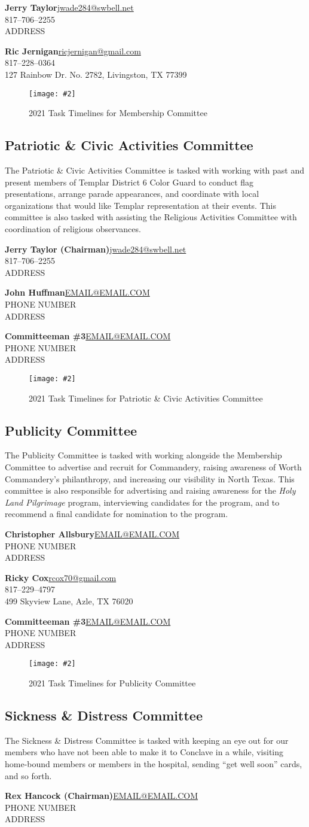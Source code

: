 \documentclass[letterpaper]{article}
\newcommand{\cman}[4]{\textbf{#1}\hfill{}\url{#2}\\\hphantom{0em}\hfill{}#3\\\hphantom{0em}\hfill{}#4}
\newcommand{\comm}[3]{\subsection*{#1 Committee\textsuperscript{#2}}The #1 Committee is tasked with #3\bigskip}
\newcommand{\mand}{\CrossMaltese}
\newcommand{\bylaw}{\Cross}
\newcommand{\gantt}[2]{
	\newgeometry{margin=0.125in}
	\begin{landscape}
		\begin{figure}
			\vspace*{\fill}
			\centering
			\caption{2021 Task Timelines for #1 Committee}
			\texttt{[image: \#2]}%
			\vspace*{\fill}
		\end{figure}
	\end{landscape}
	\restoregeometry
}
\begin{document}
		\cman{Jerry Taylor}{jwade284@swbell.net}{817--706--2255}{ADDRESS}
		
		\cman{Ric Jernigan}{ricjernigan@gmail.com}{817--228--0364}{127 Rainbow Dr. No. 2782, Livingston, TX 77399}
		
		\gantt{Membership}{2021GanttMembership.pdf}
	
	\pagebreak
	
	\comm{Patriotic \& Civic Activities}{\mand}{working with past and present members of Templar District \textnumero{} 6 Color Guard to conduct flag presentations, arrange parade appearances, and coordinate with local organizations that would like Templar representation at their events. This committee is also tasked with assisting the Religious Activities Committee with coordination of religious observances.}
	
		\cman{Jerry Taylor (Chairman)}{jwade284@swbell.net}{817--706--2255}{ADDRESS}
		
		\cman{John Huffman}{EMAIL@EMAIL.COM}{PHONE NUMBER}{ADDRESS}
		
		\cman{Committeeman \#3}{EMAIL@EMAIL.COM}{PHONE NUMBER}{ADDRESS}
	
		\gantt{Patriotic \& Civic Activities}{2021GanttPatriotic.pdf}
	
	\pagebreak
	
	\comm{Publicity}{\mand}{working alongside the Membership Committee to advertise and recruit for Commandery, raising awareness of Worth Commandery's philanthropy, and increasing our visibility in North Texas. This committee is also responsible for advertising and raising awareness for the \textit{Holy Land Pilgrimage} program, interviewing candidates for the program, and to recommend a final candidate for nomination to the program.}
	
		\cman{Christopher Allsbury}{EMAIL@EMAIL.COM}{PHONE NUMBER}{ADDRESS}
	
		\cman{Ricky Cox}{rcox70@gmail.com}{817--229--4797}{499 Skyview Lane, Azle, TX 76020}
		
		\cman{Committeeman \#3}{EMAIL@EMAIL.COM}{PHONE NUMBER}{ADDRESS}
	
		\gantt{Publicity}{2021GanttPublicity.pdf}
	
	\pagebreak
	
	\comm{Sickness \& Distress}{\bylaw}{keeping an eye out for our members who have not been able to make it to Conclave in a while, visiting home-bound members or members in the hospital, sending ``get well soon'' cards, and so forth.}
	
		\cman{Rex Hancock (Chairman)}{EMAIL@EMAIL.COM}{PHONE NUMBER}{ADDRESS}
		
\end{document}
